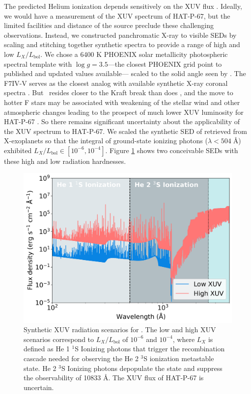\documentclass[linenumbers, twocolumn, trackchanges]{aastex631}
\newcommand{\hatp}{\object{HAT-P-67}~}
\newcommand{\hatpb}{\object{HAT-P-67 b}}
\begin{document}
The predicted Helium ionization depends sensitively on the XUV flux \citep{2019ApJ...881..133O}.  Ideally, we would have a measurement of the XUV spectrum of HAT-P-67, but the limited facilities and distance of the source preclude these challenging observations.  Instead, we constructed panchromatic X-ray to visible SEDs by scaling and stitching together synthetic spectra to provide a range of high and low $L_X/L_\mathrm{bol}$.  We chose a 6400 K PHOENIX \citep{husser13} solar metallicity photospheric spectral template with $\log{g}=3.5$---the closest PHOENIX grid point to published and updated values available--- scaled to the solid angle seen by \hatpb.  The F7IV-V  serves as the closest analog with available synthetic X-ray coronal spectra \citep{2011A&A...532A...6S}.  But \hatp resides closer to the Kraft break than does , and the move to hotter F stars may be associated with weakening of the stellar wind and other atmospheric changes leading to the prospect of much lower XUV luminosity for HAT-P-67 \citep{2022ApJ...930....7A}.  So there remains significant uncertainty about the applicability of the  XUV spectrum to HAT-P-67.  We scaled the synthetic SED of  retrieved from X-exoplanets \citep{2011A&A...532A...6S} so that the integral of ground-state ionizing photons ($\lambda<504\;$\AA) exhibited $L_X/L_\mathrm{bol} \in [10^{-6}, 10^{-4}]$.  Figure \ref{fig:XUV} shows two conceivable SEDs with these high and low radiation hardnesses.

\begin{figure}
  \includegraphics[width=\linewidth]{XUV_flux_schematic.png}
  \caption{Synthetic XUV radiation scenarios for \hatpb.  The low and high XUV scenarios correspond to $L_X/L_\mathrm{bol}$ of $10^{-6}$ and $10^{-4}$, where $L_X$ is defined as He 1 $^1$S Ionizing photons that trigger the recombination cascade needed for observing the He 2 $^3$S ionization metastable state.  He 2 $^3$S Ionizing photons depopulate the state and suppress the observability of  10833 \AA.  The XUV flux of HAT-P-67 is uncertain.}
  \label{fig:XUV}
\end{figure}
\end{document}

